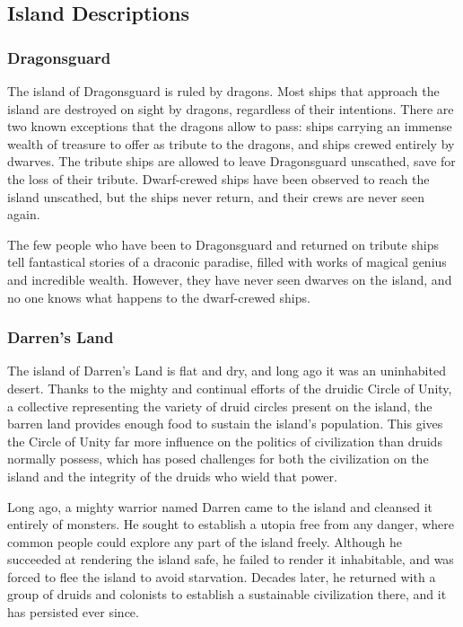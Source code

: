   \subsection{Island Descriptions}

    \subsubsection{Dragonsguard}
      The island of Dragonsguard is ruled by dragons.
      Most ships that approach the island are destroyed on sight by dragons, regardless of their intentions.
      There are two known exceptions that the dragons allow to pass: ships carrying an immense wealth of treasure to offer as tribute to the dragons, and ships crewed entirely by dwarves.
      The tribute ships are allowed to leave Dragonsguard unscathed, save for the loss of their tribute.
      Dwarf-crewed ships have been observed to reach the island unscathed, but the ships never return, and their crews are never seen again.

      The few people who have been to Dragonsguard and returned on tribute ships tell fantastical stories of a draconic paradise, filled with works of magical genius and incredible wealth.
      However, they have never seen dwarves on the island, and no one knows what happens to the dwarf-crewed ships.

    \subsubsection{Darren's Land}
      The island of Darren's Land is flat and dry, and long ago it was an uninhabited desert.
      Thanks to the mighty and continual efforts of the druidic Circle of Unity, a collective representing the variety of druid circles present on the island, the barren land provides enough food to sustain the island's population.
      This gives the Circle of Unity far more influence on the politics of civilization than druids normally possess, which has posed challenges for both the civilization on the island and the integrity of the druids who wield that power.

      Long ago, a mighty warrior named Darren came to the island and cleansed it entirely of monsters.
      He sought to establish a utopia free from any danger, where common people could explore any part of the island freely.
      Although he succeeded at rendering the island safe, he failed to render it inhabitable, and was forced to flee the island to avoid starvation.
      Decades later, he returned with a group of druids and colonists to establish a sustainable civilization there, and it has persisted ever since.

